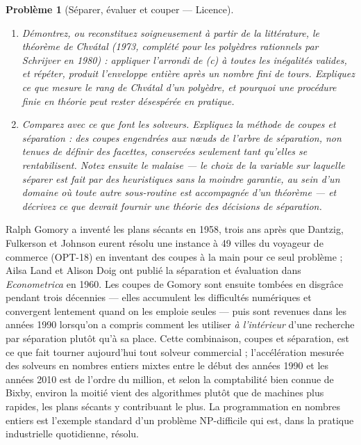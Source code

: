 \documentclass[11pt]{article}
\newtheorem{problem}{Problème}
\begin{document}
\begin{problem}[{Séparer, évaluer et couper --- Licence}]
\begin{enumerate}
\item[(d)] Démontrez, ou reconstituez soigneusement à partir de la littérature, le théorème de Chvátal (1973, complété pour les polyèdres rationnels par Schrijver en 1980) : appliquer l'arrondi de (c) à toutes les inégalités valides, et répéter, produit l'enveloppe entière après un nombre fini de tours. Expliquez ce que mesure le rang de Chvátal d'un polyèdre, et pourquoi une procédure finie en théorie peut rester désespérée en pratique.
\item[(e)] Comparez avec ce que font les solveurs. Expliquez la méthode de coupes et séparation : des coupes engendrées aux n\oe{}uds de l'arbre de séparation, non tenues de définir des facettes, conservées seulement tant qu'elles se rentabilisent. Notez ensuite le malaise --- le choix de la variable sur laquelle séparer est fait par des heuristiques sans la moindre garantie, au sein d'un domaine où toute autre sous-routine est accompagnée d'un théorème --- et décrivez ce que devrait fournir une théorie des décisions de séparation.
\end{enumerate}

\end{problem}

\noindent Ralph Gomory a inventé les plans sécants en 1958, trois ans après que Dantzig, Fulkerson et Johnson eurent résolu une instance à 49 villes du voyageur de commerce (OPT-18) en inventant des coupes à la main pour ce seul problème ; Ailsa Land et Alison Doig ont publié la séparation et évaluation dans \textit{Econometrica} en 1960. Les coupes de Gomory sont ensuite tombées en disgrâce pendant trois décennies --- elles accumulent les difficultés numériques et convergent lentement quand on les emploie seules --- puis sont revenues dans les années 1990 lorsqu'on a compris comment les utiliser \textit{à l'intérieur} d'une recherche par séparation plutôt qu'à sa place. Cette combinaison, coupes et séparation, est ce que fait tourner aujourd'hui tout solveur commercial ; l'accélération mesurée des solveurs en nombres entiers mixtes entre le début des années 1990 et les années 2010 est de l'ordre du million, et selon la comptabilité bien connue de Bixby, environ la moitié vient des algorithmes plutôt que de machines plus rapides, les plans sécants y contribuant le plus. La programmation en nombres entiers est l'exemple standard d'un problème NP-difficile qui est, dans la pratique industrielle quotidienne, résolu.
\end{document}
